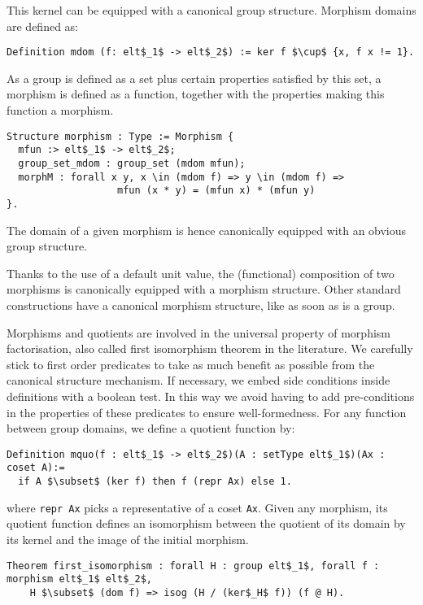 \noindent This kernel can be equipped with a canonical group structure. Morphism
domains are defined as:
\begin{lstlisting}
Definition mdom (f: elt$_1$ -> elt$_2$) := ker f $\cup$ {x, f x != 1}.
\end{lstlisting}
As a group is defined as a set plus certain properties
satisfied by this set, a morphism is defined as a function, together
with the properties making this function a morphism.

\begin{lstlisting}
Structure morphism : Type := Morphism { 
  mfun :> elt$_1$ -> elt$_2$; 
  group_set_mdom : group_set (mdom mfun); 
  morphM : forall x y, x \in (mdom f) => y \in (mdom f) =>
                   mfun (x * y) = (mfun x) * (mfun y)
}.
\end{lstlisting} The domain  of a given morphism  is hence
canonically equipped with an obvious group structure.

Thanks to the use of a default unit value, the (functional)
composition of two morphisms is canonically equipped with a morphism
structure. Other standard constructions have a canonical
morphism structure, like  as soon as  is a
group.

Morphisms and quotients are involved in the universal property of
morphism factorisation, also called first isomorphism theorem in the
literature. We carefully stick to
first order predicates to take as much benefit as possible from the
canonical structure mechanism. If necessary, we embed side conditions
inside definitions with a boolean test. In this way
we avoid having to add pre-conditions in the properties of these
predicates to ensure well-formedness. 
For any function between group domains, we
define a quotient function by:

\begin{lstlisting} 
Definition mquo(f : elt$_1$ -> elt$_2$)(A : setType elt$_1$)(Ax : coset A):=
  if A $\subset$ (ker f) then f (repr Ax) else 1.
\end{lstlisting} where \lstinline[basicstyle=\footnotesize]+repr Ax+
picks a representative of a coset 
\lstinline[basicstyle=\footnotesize]+Ax+.  Given any
morphism, its quotient function defines an isomorphism between the
quotient of its domain by its kernel and the image of the initial
morphism.

\begin{lstlisting} 
Theorem first_isomorphism : forall H : group elt$_1$, forall f : morphism elt$_1$ elt$_2$,
    H $\subset$ (dom f) => isog (H / (ker$_H$ f)) (f @ H).
\end{lstlisting}

